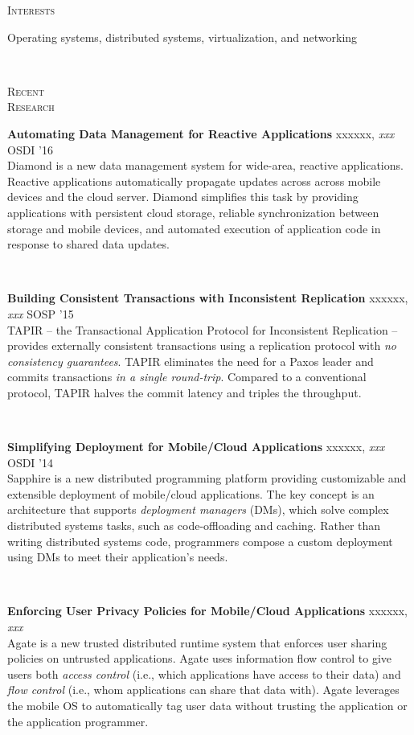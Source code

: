\documentclass[10pt,minionpro]{report}
\newlength{\sectiongap}
\newlength{\entrygap}
\newlength{\sectioncolwidth}
\newlength{\colgap}
\newlength{\stuffwidth}
\def\ifEqString#1#2{\def\testa{#1}\def\testb{#2}%
  \ifx\testa\testb}
\newenvironment{rtable}{
  \begin{minipage}{\textwidth}
  }{
  \end{minipage}
}
\newenvironment{rentry}[3][xxx]{
  \begin{minipage}[t]{\hsize}
    \textbf{#2}\ifEqString{#1}{xxx}\relax\else, \textit{#1}\fi
    \hspace{\stretch{1}} #3 \\
  }{
    \removelastskip
  \end{minipage}
  \\[\entrygap]  %
}
\newenvironment{rsection}[1]{
  \begin{minipage}[t]{\sectioncolwidth}
    \textsc{#1}
  \end{minipage}
  \hspace{\colgap}
  \begin{minipage}[t]{\stuffwidth}
  }{
    \removelastskip
  \end{minipage}
  \\[\sectiongap]
}
\begin{document}
\begin{rtable}
  \begin{rsection}{Interests}
    Operating systems, distributed systems, virtualization, and networking
  \end{rsection}
  
  \begin{rsection}{Recent\\Research}
    \begin{rentry}{Automating Data Management for Reactive
        Applications}{OSDI '16}
      Diamond is a new data management system for wide-area, reactive
      applications. Reactive applications automatically propagate
      updates across across mobile devices and the cloud
      server. Diamond simplifies this task by providing applications
      with persistent cloud storage, reliable synchronization between
      storage and mobile devices, and automated execution of
      application code in response to shared data updates.
    \end{rentry}

    \begin{rentry}{Building Consistent Transactions with Inconsistent
        Replication}{SOSP '15}
      TAPIR -- the Transactional Application Protocol for Inconsistent
      Replication -- provides externally consistent transactions using
      a replication protocol with \emph{no consistency guarantees}.
      TAPIR eliminates the need for a Paxos leader and
      commits transactions \emph{in a single round-trip}. Compared to
      a conventional protocol, TAPIR halves the commit latency and
      triples the throughput.
    \end{rentry}

    \begin{rentry}{Simplifying Deployment for Mobile/Cloud Applications}{OSDI '14}
      Sapphire is a new distributed programming platform providing
      customizable and extensible deployment of mobile/cloud
      applications. The key concept is an architecture that supports
      \emph{deployment managers} (DMs), which solve complex
      distributed systems tasks, such as code-offloading and
      caching. Rather than writing distributed systems code,
      programmers compose a custom deployment using DMs to meet their
      application's needs.
    \end{rentry}

    \begin{rentry}{Enforcing User Privacy Policies for Mobile/Cloud
        Applications}{}
      Agate is a new trusted distributed runtime system that enforces
      user sharing policies on untrusted applications.  Agate uses
      information flow control to give users both \emph{access
        control} (i.e., which applications have access to their data)
      and \emph{flow control} (i.e., whom applications can share that
      data with).  Agate leverages the mobile OS to automatically tag
      user data without trusting the application or the application
      programmer.
    \end{rentry}


\end{rsection}
\end{rtable}
\end{document}
